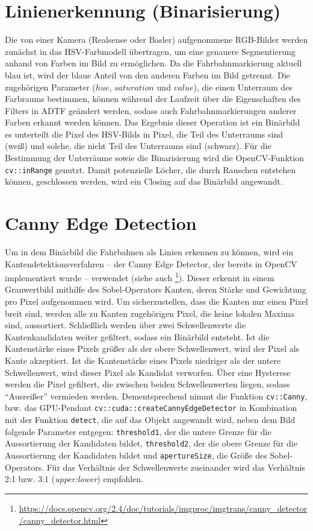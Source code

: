 \documentclass[a4paper,12pt]{report}
\begin{document}
\section{Linienerkennung (Binarisierung)}	
	Die von einer Kamera (Realsense oder Basler) aufgenommene RGB-Bilder werden zunächst in das HSV-Farbmodell übertragen, um eine genauere Segmentierung anhand von Farben im Bild zu ermöglichen.
	Da die Fahrbahnmarkierung aktuell blau ist, wird der blaue Anteil von den anderen Farben im Bild getrennt. Die zugehörigen Parameter ($hue$, $saturation$ und $value$), die einen Unterraum des Farbraums bestimmen, können während der Laufzeit über die Eigenschaften des Filters in ADTF geändert werden, sodass auch Fahrbahnmarkierungen anderer Farben erkannt werden können.
	Das Ergebnis dieser Operation ist ein Binärbild es unterteilt die Pixel des HSV-Bilds in Pixel, die Teil des Unterraums sind (weiß) und solche, die nicht Teil des Unterraums sind (schwarz). Für die Bestimmung der Unterräume sowie die Binarisierung wird die OpenCV-Funktion \texttt{cv::inRange} genutzt.
	Damit potenzielle Löcher, die durch Rauschen entstehen können, geschlossen werden, wird ein Closing auf das Binärbild angewandt.

\section{Canny Edge Detection} %
	Um in dem Binärbild die Fahrbahnen als Linien erkennen zu können, wird ein Kantendetektionsverfahren -- der Canny Edge Detector, der bereits in OpenCV implementiert wurde -- verwendet (siehe auch \footnote{\url{https://docs.opencv.org/2.4/doc/tutorials/imgproc/imgtrans/canny_detector/canny_detector.html}}). Dieser erkennt in einem Grauwertbild mithilfe des Sobel-Operators Kanten, deren Stärke und Gewichtung pro Pixel aufgenommen wird. Um sicherzustellen, dass die Kanten nur einen Pixel breit sind, werden alle zu Kanten zugehörigen Pixel, die keine lokalen Maxima sind, aussortiert. Schließlich werden über zwei Schwellenwerte die Kantenkandidaten weiter gefiltert, sodass ein Binärbild entsteht. Ist die Kantenstärke eines Pixels größer als der obere Schwellenwert, wird der Pixel als Kante akzeptiert. Ist die Kantenstärke eines Pixels niedriger als der untere Schwellenwert, wird dieser Pixel als Kandidat verworfen. Über eine Hysterese werden die Pixel gefiltert, die zwischen beiden Schwellenwerten liegen, sodass "`Ausreißer"' vermieden werden. Dementsprechend nimmt die Funktion \texttt{cv::Canny}, bzw. das GPU-Pendant \texttt{cv::cuda::createCannyEdgeDetector} in Kombination mit der Funktion \texttt{detect}, die auf das Objekt angewandt wird, neben dem Bild folgende Parameter entgegen: \texttt{threshold1}, der die untere Grenze für die Aussortierung der Kandidaten bildet, \texttt{threshold2}, der die obere Grenze für die Aussortierung der Kandidaten bildet und \texttt{apertureSize}, die Größe des Sobel-Operators. Für das Verhältnis der Schwellenwerte zueinander wird das Verhältnis 2:1 bzw. 3:1 (\textit{upper:lower}) empfohlen.
	
\end{document}
